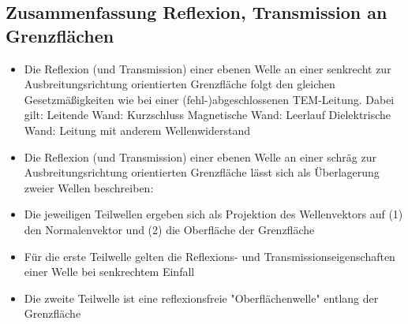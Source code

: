 \documentclass[english]{latex4ei/latex4ei_sheet}
\begin{document}
\begin{sectionbox}
    \subsection{Zusammenfassung Reflexion, Transmission an Grenzflächen}
    \begin{itemize}
        \item Die Reflexion (und Transmission) einer ebenen Welle an einer senkrecht zur Ausbreitungsrichtung orientierten Grenzfläche folgt den gleichen Gesetzmäßigkeiten wie bei einer (fehl-)abgeschlossenen TEM-Leitung. Dabei gilt:
              \subitem Leitende Wand: Kurzschluss
              \subitem Magnetische Wand: Leerlauf
              \subitem Dielektrische Wand: Leitung mit anderem Wellenwiderstand
        \item Die Reflexion (und Transmission) einer ebenen Welle an einer schräg zur Ausbreitungsrichtung orientierten Grenzfläche lässt sich als Überlagerung zweier Wellen beschreiben:
        \item Die jeweiligen Teilwellen ergeben sich als Projektion des Wellenvektors auf (1) den Normalenvektor und (2) die Oberfläche der Grenzfläche
        \item Für die erste Teilwelle gelten die Reflexions- und Transmissionseigenschaften einer Welle bei senkrechtem Einfall
        \item Die zweite Teilwelle ist eine reflexionsfreie "Oberflächenwelle" entlang der Grenzfläche
    \end{itemize}
\end{sectionbox}
\end{document}
